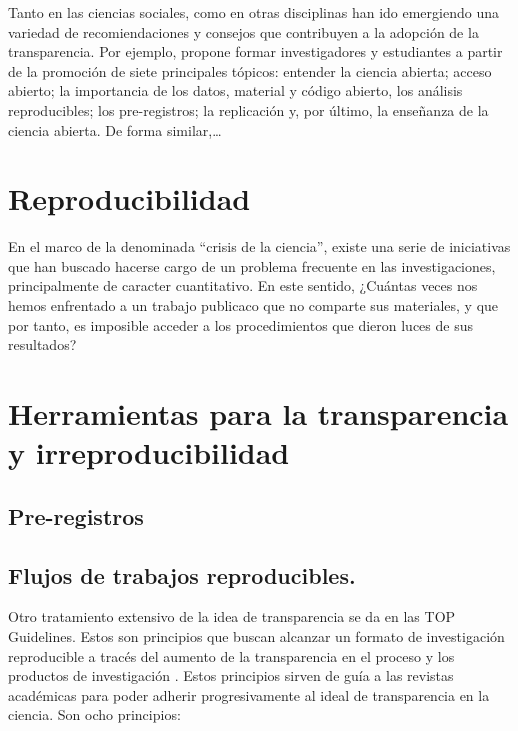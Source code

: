 \documentclass[
]{book}
\begin{document}
Tanto en las ciencias sociales, como en otras disciplinas han ido emergiendo una variedad de recomiendaciones y consejos que contribuyen a la adopción de la transparencia. Por ejemplo, \citet{cruwell_Easy_2018} propone formar investigadores y estudiantes a partir de la promoción de siete principales tópicos: entender la ciencia abierta; acceso abierto; la importancia de los datos, material y código abierto, los análisis reproducibles; los pre-registros; la replicación y, por último, la enseñanza de la ciencia abierta. De forma similar,\ldots{}

\hypertarget{reproducibilidad}{%
\chapter{Reproducibilidad}\label{reproducibilidad}}

En el marco de la denominada ``crisis de la ciencia'', existe una serie de iniciativas que han buscado hacerse cargo de un problema frecuente en las investigaciones, principalmente de caracter cuantitativo. En este sentido, ¿Cuántas veces nos hemos enfrentado a un trabajo publicaco que no comparte sus materiales, y que por tanto, es imposible acceder a los procedimientos que dieron luces de sus resultados?

\hypertarget{herramientas-para-la-transparencia-y-irreproducibilidad}{%
\chapter{Herramientas para la transparencia y irreproducibilidad}\label{herramientas-para-la-transparencia-y-irreproducibilidad}}

\hypertarget{pre-registros}{%
\section{Pre-registros}\label{pre-registros}}

\hypertarget{flujos-de-trabajos-reproducibles.}{%
\section{Flujos de trabajos reproducibles.}\label{flujos-de-trabajos-reproducibles.}}

Otro tratamiento extensivo de la idea de transparencia se da en las TOP Guidelines. Estos son principios que buscan alcanzar un formato de investigación reproducible a tracés del aumento de la transparencia en el proceso y los productos de investigación \citep{nosek_Transparency_2014}. Estos principios sirven de guía a las revistas académicas para poder adherir progresivamente al ideal de transparencia en la ciencia. Son ocho principios:
\end{document}
